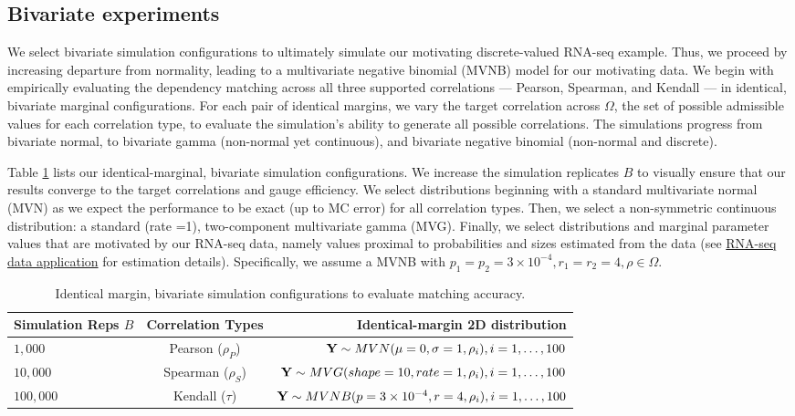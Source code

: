 \documentclass{article}
\begin{document}
\hypertarget{bivariate-experiments}{%
\subsection{Bivariate experiments}\label{bivariate-experiments}}

We select bivariate simulation configurations to ultimately simulate our
motivating discrete-valued RNA-seq example. Thus, we proceed by
increasing departure from normality, leading to a multivariate negative
binomial (MVNB) model for our motivating data. We begin with empirically
evaluating the dependency matching across all three supported
correlations --- Pearson, Spearman, and Kendall --- in identical,
bivariate marginal configurations. For each pair of identical margins,
we vary the target correlation across \(\Omega\), the set of possible
admissible values for each correlation type, to evaluate the
simulation's ability to generate all possible correlations. The
simulations progress from bivariate normal, to bivariate gamma
(non-normal yet continuous), and bivariate negative binomial (non-normal
and discrete).

Table \ref{tab:sims} lists our identical-marginal, bivariate simulation
configurations. We increase the simulation replicates \(B\) to visually
ensure that our results converge to the target correlations and gauge
efficiency. We select distributions beginning with a standard
multivariate normal (MVN) as we expect the performance to be exact (up
to MC error) for all correlation types. Then, we select a non-symmetric
continuous distribution: a standard (rate =1), two-component
multivariate gamma (MVG). Finally, we select distributions and marginal
parameter values that are motivated by our RNA-seq data, namely values
proximal to probabilities and sizes estimated from the data (see
\href{examples}{RNA-seq data application} for estimation details).
Specifically, we assume a MVNB with
\(p_1 = p_2 = 3\times10^{-4}, r_1 = r_2 = 4, \rho \in \Omega\).

\begin{table}[]
\centering
\caption{ \label{tab:sims} Identical margin, bivariate simulation configurations to evaluate matching accuracy.}
\begin{tabular}{@{}lcr@{}}
\toprule
Simulation Reps $B$ & Correlation Types & Identical-margin 2D distribution \\ \midrule
$1,000$ & Pearson ($\rho_P$) & ${\bf Y} \sim MVN( \mu= 0 , \sigma = 1, \rho_i ), i=1,\ldots,100$ \\
$10,000$ & Spearman ($\rho_S$) & ${\bf Y} \sim MVG( shape = 10, rate = 1, \rho_i ), i=1,\ldots,100$ \\
$100,000$ & Kendall ($\tau$) & ${\bf Y} \sim MVNB(p = 3\times10^{-4}, r = 4,\rho_i), i=1,\ldots,100$ \\ \bottomrule
\end{tabular}
\end{table}
\end{document}
